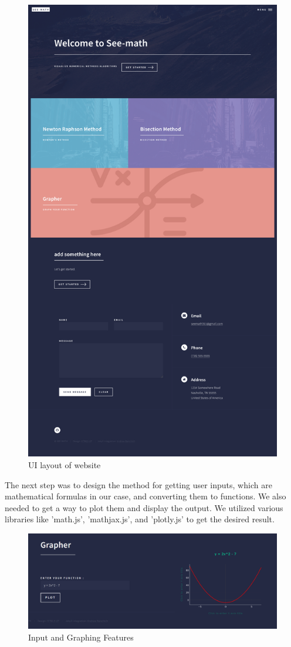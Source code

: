 \begin{figure}[h!]
	\centering
	\includegraphics[width=0.8\linewidth]{seemath1}
	\caption{UI layout of website}
\end{figure}

\pagebreak
The next step was to design the method for getting user inputs, which are mathematical formulas in our case, and converting them to functions. We also needed to get a way to plot them and display the output. We utilized various libraries like 'math.js', 'mathjax.js', and 'plotly.js' to get the desired result.

\begin{figure}[h!]
	\centering
	\includegraphics[width=0.89\linewidth]{seemath3}
	\caption{Input and Graphing Features}
\end{figure}

